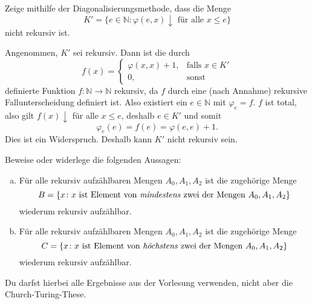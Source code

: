 \documentclass[german,headsepline]{scrartcl}
\begin{document}
	\begin{question}
		Zeige mithilfe der Diagonalisierungsmethode, dass die Menge
		\[K'=\{e\in\mathbb{N}\colon\varphi(e,x)\downarrow\text{ für alle }x\leq e\}\]
		nicht rekursiv ist.
	\end{question}
	\begin{solution}
		Angenommen, $K'$ sei rekursiv. Dann ist die durch
		\[f(x)=\begin{cases}
			\varphi(x,x)+1, &\text{falls }x\in K' \\
			0, &\text{sonst}
		\end{cases}\]
		definierte Funktion $f:\mathbb{N}\to\mathbb{N}$ rekursiv,
		da $f$ durch eine (nach Annahme) rekursive Fallunterscheidung definiert ist.
		Also existiert ein $e\in\mathbb{N}$ mit $\varphi_e=f$.
		$f$ ist total, also gilt $f(x)\downarrow$ für alle $x\leq e$, deshalb $e\in K'$ und somit
		\[\varphi_e(e)=f(e)=\varphi(e,e)+1.\]
		Dies ist ein Widerspruch. Deshalb kann $K'$ nicht rekursiv sein.
	\end{solution}
	
	\begin{question}[subtitle={Klausur 2015}]
		Beweise oder widerlege die folgenden Aussagen:
		\begin{enumerate}[(a)]
			\item Für alle rekursiv aufzählbaren Mengen $A_0,A_1,A_2$ ist die zugehörige Menge
				\[B=\{x\colon x\text{ ist Element von \emph{mindestens} zwei der Mengen }A_0,A_1,A_2\}\]
				wiederum rekursiv aufzählbar.
			\item Für alle rekursiv aufzählbaren Mengen $A_0,A_1,A_2$ ist die zugehörige Menge
				\[C=\{x\colon x\text{ ist Element von \emph{höchstens} zwei der Mengen }A_0,A_1,A_2\}\]
				wiederum rekursiv aufzählbar.
		\end{enumerate}
		Du darfst hierbei alle Ergebnisse aus der Vorlesung verwenden, nicht aber die Church-Turing-These.
	\end{question}
	
\end{document}
